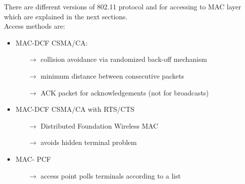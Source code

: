 There are different versions of 802.11 protocol and for accessing to MAC layer which are explained in the next sections.\\
Access methods are:
\begin{itemize}
    \item MAC-DCF CSMA/CA:
    \begin{itemize}
        \item[$\rightarrow$] collision avoidance via randomized back-off mechanism
        \item[$\rightarrow$] minimum distance between consecutive packets
        \item[$\rightarrow$] ACK packet for acknowledgements (not for broadcasts)
    \end{itemize}
    \item MAC-DCF CSMA/CA with RTS/CTS
    \begin{itemize}
        \item[$\rightarrow$] Distributed Foundation Wireless MAC
        \item[$\rightarrow$] avoids hidden terminal problem
    \end{itemize}
    \item MAC- PCF
    \begin{itemize}
        \item[$\rightarrow$] access point polls terminals according to a list
    \end{itemize}
\end{itemize}

